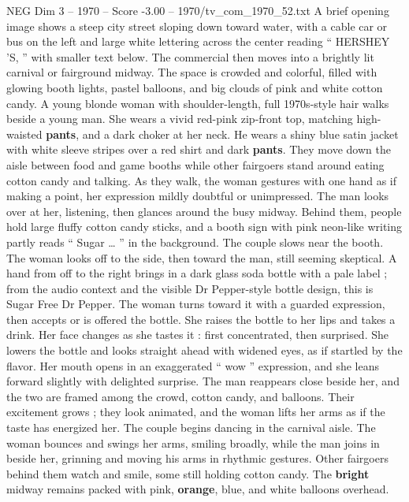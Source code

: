 \begin{textsample}{NEG Dim 3 – 1970 – Score -3.00 – 1970/tv\_com\_1970\_52.txt}  \label{ex:f3_neg_061}
A brief opening image shows a steep city street sloping down toward water, with a cable car or bus on the left and large white lettering across the center reading “ HERSHEY ’S, ” with smaller text below.
The commercial then moves into a brightly lit carnival or fairground midway.
The space is crowded and colorful, filled with glowing booth lights, pastel balloons, and big clouds of pink and white cotton candy.
A young blonde woman with shoulder-length, full 1970s-style hair walks beside a young man.
She wears a vivid red-pink zip-front top, matching high-waisted \textbf{pants}, and a dark choker at her neck.
He wears a shiny blue satin jacket with white sleeve stripes over a red shirt and dark \textbf{pants}.
They move down the aisle between food and game booths while other fairgoers stand around eating cotton candy and talking.
As they walk, the woman gestures with one hand as if making a point, her expression mildly doubtful or unimpressed.
The man looks over at her, listening, then glances around the busy midway.
Behind them, people hold large fluffy cotton candy sticks, and a booth sign with pink neon-like writing partly reads “ Sugar … ” in the background.
The couple slows near the booth.
The woman looks off to the side, then toward the man, still seeming skeptical.
A hand from off to the right brings in a dark glass soda bottle with a pale label ; from the audio context and the visible Dr Pepper-style bottle design, this is Sugar Free Dr Pepper.
The woman turns toward it with a guarded expression, then accepts or is offered the bottle.
She raises the bottle to her lips and takes a drink.
Her face changes as she tastes it : first concentrated, then surprised.
She lowers the bottle and looks straight ahead with widened eyes, as if startled by the flavor.
Her mouth opens in an exaggerated “ wow ” expression, and she leans forward slightly with delighted surprise.
The man reappears close beside her, and the two are framed among the crowd, cotton candy, and balloons.
Their excitement grows ; they look animated, and the woman lifts her arms as if the taste has energized her.
The couple begins dancing in the carnival aisle.
The woman bounces and swings her arms, smiling broadly, while the man joins in beside her, grinning and moving his arms in rhythmic gestures.
Other fairgoers behind them watch and smile, some still holding cotton candy.
The \textbf{bright} midway remains packed with pink, \textbf{orange}, blue, and white balloons overhead.

\end{textsample}
